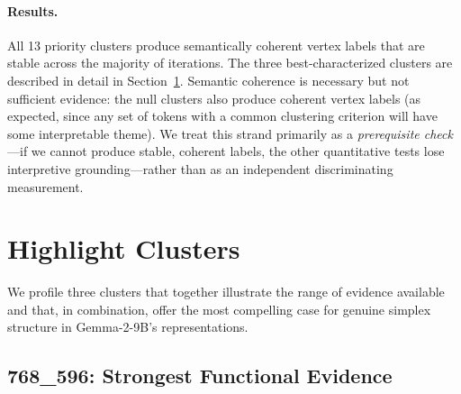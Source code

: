 \documentclass{article}
\begin{document}
\paragraph{Results.}  All 13 priority clusters produce semantically coherent vertex
labels that are stable across the majority of iterations.  The three best-characterized
clusters are described in detail in Section~\ref{sec:highlights}.  Semantic
coherence is necessary but not sufficient evidence: the null clusters also produce
coherent vertex labels (as expected, since any set of tokens with a common clustering
criterion will have some interpretable theme).  We treat this strand primarily as a
\emph{prerequisite check}---if we cannot produce stable, coherent labels, the other
quantitative tests lose interpretive grounding---rather than as an independent
discriminating measurement.

\section{Highlight Clusters}
\label{sec:highlights}

We profile three clusters that together illustrate the range of evidence available
and that, in combination, offer the most compelling case for genuine simplex
structure in Gemma-2-9B's representations.

\subsection{768\_596: Strongest Functional Evidence}
\label{sec:highlight_596}
\end{document}
